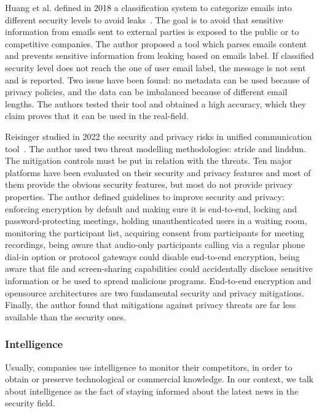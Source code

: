 Huang et al. defined in 2018 a classification system to categorize emails into different security levels to avoid leaks~\cite{huang_email_2018}. The goal is to avoid that sensitive information from emails sent to external parties is exposed to the public or to competitive companies. The author proposed a tool which parses emails content and prevents sensitive information from leaking based on emails label. If classified security level does not reach the one of user email label, the message is not sent and is reported. Two issue have been found: no \gls{metadata} can be used because of privacy policies, and the data can be imbalanced because of different email lengths. The authors tested their tool and obtained a high accuracy, which they claim proves that it can be used in the real-field. %

Reisinger studied in 2022 the security and privacy risks in unified communication tool~\cite{reisinger_security_2022}. The author used two threat modelling methodologies: \gls{stride} and \gls{linddun}. The mitigation controls must be put in relation with the threats. Ten major platforms have been evaluated on their security and privacy features and most of them provide the obvious security features, but most do not provide privacy properties. The author defined guidelines to improve security and privacy: enforcing encryption by default and making sure it is end-to-end, locking and password-protecting meetings, holding unauthenticated users in a waiting room, monitoring the participant list, acquiring consent from participants for meeting recordings, being aware that audio-only participants calling via a regular phone dial-in option or protocol gateways could disable end-to-end encryption, being aware that file and screen-sharing capabilities could accidentally disclose sensitive information or be used to spread malicious programs. End-to-end encryption and \gls{opensource} architectures are two fundamental security and privacy mitigations. Finally, the author found that mitigations against privacy threats are far less available than the security ones. %

\subsubsection{Intelligence}
\label{subsubsec:state_review_results_intelligence}

Usually, companies use intelligence to monitor their competitors, in order to obtain or preserve technological or commercial knowledge. In our context, we talk about intelligence as the fact of staying informed about the latest news in the security field.

